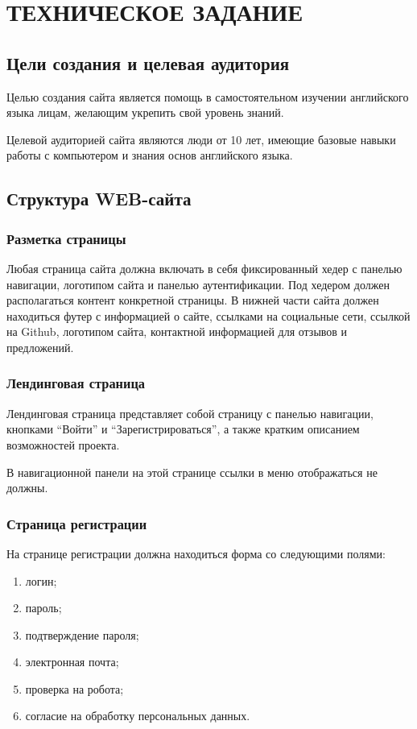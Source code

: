 \documentclass[a4paper,14pt]{extarticle}
\begin{document}
\section{ТЕХНИЧЕСКОЕ ЗАДАНИЕ}
\subsection{Цели создания и целевая аудитория}
Целью создания сайта является помощь в самостоятельном изучении английского языка
лицам, желающим укрепить свой уровень знаний.

Целевой аудиторией сайта являются люди от 10 лет, имеющие базовые навыки работы с
компьютером и знания основ английского языка.

\subsection{Структура WEB-сайта}
\subsubsection{Разметка страницы}
Любая страница сайта должна включать в себя фиксированный хедер с панелью навигации, логотипом сайта и панелью аутентификации.
Под хедером должен располагаться контент конкретной страницы. В нижней части сайта должен находиться футер с информацией о сайте,
ссылками на социальные сети, ссылкой на Github, логотипом сайта, контактной информацией для отзывов и предложений.
\subsubsection{Лендинговая страница}
Лендинговая страница представляет собой страницу с панелью навигации, кнопками \enquote{Войти}
и \enquote{Зарегистрироваться}, а также кратким описанием возможностей проекта.

В навигационной панели на этой странице ссылки в меню отображаться не должны.

\subsubsection{Страница регистрации}
На странице регистрации должна находиться форма со следующими полями:
\begin{enumerate}
    \item логин;
    \item пароль;
    \item подтверждение пароля;
    \item электронная почта;
    \item проверка на робота;
    \item согласие на обработку персональных данных.
\end{enumerate}
\end{document}
